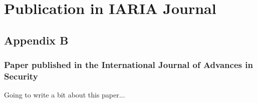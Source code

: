 
\chapter{Publication in IARIA Journal}
\section{Appendix B}
\subsection{Paper published in the International Journal of Advances in Security}
Going to write a bit about this paper...

% 
% 
